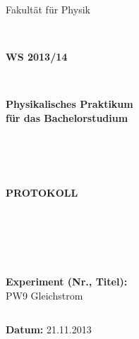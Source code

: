\documentclass[12pt,a4paper]{article}
\begin{document}
%
%

%




\thispagestyle{empty}
			\begin{center}
			\Large{Fakultät für Physik}\\
			\end{center}
\begin{verbatim}


\end{verbatim}
			\begin{center}
			\textbf{\LARGE WS 2013/14}
			\end{center}
\begin{verbatim}


\end{verbatim}
			\begin{center}
			\textbf{\LARGE{Physikalisches Praktikum\\ für das Bachelorstudium}}
			\end{center}
\begin{verbatim}




\end{verbatim}

			\begin{center}
			\textbf{\LARGE{PROTOKOLL}}
			\end{center}
			
\begin{verbatim}





\end{verbatim}

			\begin{flushleft}
			\textbf{\Large{Experiment (Nr., Titel):}}\\
			\LARGE{PW9 Gleichstrom}	
			\end{flushleft}

\begin{verbatim}

\end{verbatim}	
			\begin{flushleft}
			\textbf{\Large{Datum:}} \Large{21.11.2013}
			\end{flushleft}
			
\end{document}
